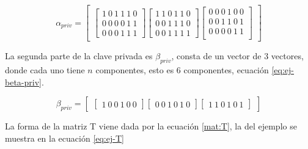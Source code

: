 \begin{equation}\label{eq:ej-alpha-priv}
{\alpha_{priv}} = \left[
	\begin{array}{c}
	\left[\begin{array}{c}
		1\ 0\ 1\ 1\ 1\ 0\\
		0\ 0\ 0\ 0\ 1\ 1\\
		0\ 0\ 0\ 1\ 1\ 1
	\end{array}\right]
		
	\left[\begin{array}{c}
		1\ 1\ 0\ 1\ 1\ 0\\
		0\ 0\ 1\ 1\ 1\ 0\\
		0\ 0\ 1\ 1\ 1\ 1
	\end{array}\right]
	
	\left[\begin{array}{c}
		0\ 0\ 0\ 1\ 0\ 0\\
		0\ 0\ 1\ 1\ 0\ 1\\
		0\ 0\ 0\ 0\ 1\ 1\\
	\end{array}\right]
	\end{array}
	\right]
\end{equation}

La segunda parte de la clave privada es $\beta_{priv}$, consta de un vector de $3$ vectores, donde cada uno tiene $n$ componentes, esto es $6$ componentes, ecuación \ref{eq:ej-beta-priv}.

\begin{equation}\label{eq:ej-beta-priv}
{\beta_{priv}} = \left[
	\begin{array}{c}
	\left[\begin{array}{c}
		1\ 0\ 0\ 1\ 0\ 0
	\end{array}\right]
	
	\left[\begin{array}{c}
		0\ 0\ 1\ 0\ 1\ 0
	\end{array}\right]
	
	\left[\begin{array}{c}
		1\ 1\ 0\ 1\ 0\ 1
	\end{array}\right]
	\end{array}
	\right]
\end{equation}


La forma de la matriz T viene dada por la ecuación \ref{mat:T}, la del ejemplo se muestra en la ecuación \ref{eq:ej-T}

